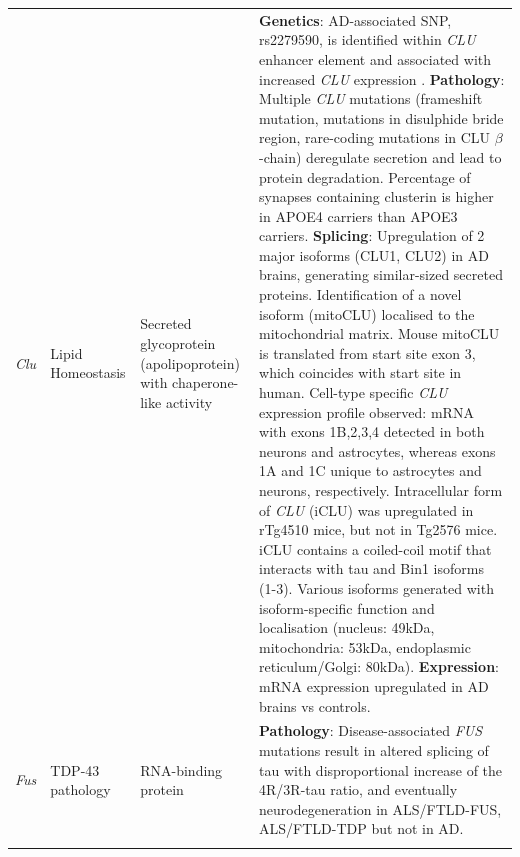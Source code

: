 \begin{landscape}
\begin{longtable}[c]{p{1cm}p{2cm}p{4cm}p{19cm}}
			\centering \textit{Clu} &
			\centering Lipid Homeostasis  &
			\centering Secreted glycoprotein (apolipoprotein) with chaperone-like activity  &	
			\tabitem \textbf{Genetics}: AD-associated SNP, rs2279590, is identified within \textit{CLU} enhancer element and associated with increased \textit{CLU} expression \cite{Padhy2017}.	\newline 	
			\tabitem \textbf{Pathology}: Multiple \textit{CLU} mutations (frameshift mutation, mutations in disulphide bride region, rare-coding mutations in CLU $\beta$-chain) deregulate secretion and lead to protein degradation\cite{Bettens2015}. \newline 
			\tabitem Percentage of synapses containing clusterin is higher in APOE4 carriers than APOE3 carriers\cite{Jackson2019}. \newline 
			\tabitem \textbf{Splicing}: Upregulation of 2 major isoforms (CLU1, CLU2) in AD brains, generating similar-sized secreted proteins\cite{Ling2012}.\newline 
			\tabitem Identification of a novel isoform (mitoCLU) localised to the mitochondrial matrix. Mouse mitoCLU is translated from start site exon 3, which coincides with start site in human. \newline 
			\tabitem Cell-type specific \textit{CLU} expression profile observed: mRNA with exons 1B,2,3,4 detected in both neurons and astrocytes, whereas exons 1A and 1C unique to astrocytes and neurons, respectively\cite{Herring2019}. \newline 
			\tabitem Intracellular form of \textit{CLU} (iCLU) was upregulated in rTg4510 mice, but not in Tg2576 mice. iCLU contains a coiled-coil motif that interacts with tau and Bin1 isoforms (1-3).\cite{Zhou2014} \newline		
			\tabitem Various isoforms generated with isoform-specific function and localisation (nucleus: 49kDa, mitochondria: 53kDa, endoplasmic reticulum/Golgi: 80kDa). \newline
			\tabitem \textbf{Expression}: mRNA expression upregulated in AD brains vs controls.\cite{Karch2012} \\
			\hdashline[0.5pt/5pt]	
			
			\centering \textit{Fus} &
			\centering TDP-43 pathology  &
			\centering RNA-binding protein  &			
			\tabitem \textbf{Pathology}: Disease-associated \textit{FUS} mutations result in altered splicing of tau with disproportional increase of the 4R/3R-tau ratio, and eventually neurodegeneration in ALS/FTLD-FUS, ALS/FTLD-TDP but not in AD\cite{Ishigaki2020}. \\
			\hdashline[0.5pt/5pt]
			

\end{longtable}
\end{landscape}
